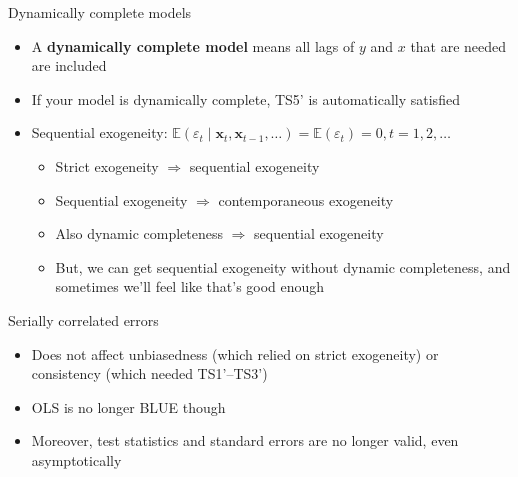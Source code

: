 \documentclass[
  ignorenonframetext,
]{beamer}
\providecommand{\tightlist}{%
  \setlength{\itemsep}{0pt}\setlength{\parskip}{0pt}}
\newcommand{\setsep}{\setlength{\itemsep}{3pt}}
\newcommand{\setskip}{\setlength{\parskip}{3pt}}
\renewcommand{\tightlist}{\setsep\setskip}
\begin{document}
\begin{frame}{Dynamically complete models}
\protect\hypertarget{dynamically-complete-models}{}
\begin{itemize}[<+->]
\tightlist
\item
  A \textbf{dynamically complete model} means all lags of \(y\) and \(x\) that are needed are included
\item
  If your model is dynamically complete, TS5' is automatically satisfied
\item
  Sequential exogeneity: \(\mathbb{E}\left(\varepsilon_t\mid\mathbf{x}_t, \mathbf{x}_{t-1}, \dots\right) = \mathbb{E}\left(\varepsilon_t\right) = 0, t = 1, 2, \dots\)

  \begin{itemize}[<+->]
  \tightlist
  \item
    Strict exogeneity \(\Rightarrow\) sequential exogeneity
  \item
    Sequential exogeneity \(\Rightarrow\) contemporaneous exogeneity
  \item
    Also dynamic completeness \(\Rightarrow\) sequential exogeneity
  \item
    But, we can get sequential exogeneity without dynamic completeness, and sometimes we'll feel like that's good enough
  \end{itemize}
\end{itemize}
\end{frame}

\begin{frame}{Serially correlated errors}
\protect\hypertarget{serially-correlated-errors}{}
\begin{itemize}[<+->]
\tightlist
\item
  Does not affect unbiasedness (which relied on strict exogeneity) or consistency (which needed TS1'--TS3')
\item
  OLS is no longer BLUE though
\item
  Moreover, test statistics and standard errors are no longer valid, even asymptotically
\end{itemize}
\end{frame}
\end{document}
